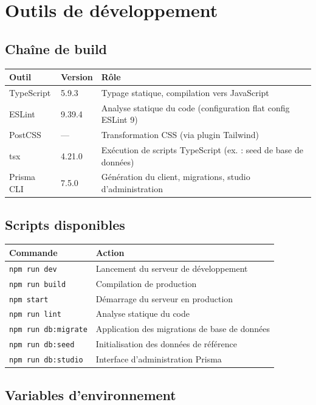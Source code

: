 \documentclass[a4paper,12pt,french]{article}
\begin{document}
\section{Outils de développement}

\subsection{Chaîne de build}

\begin{tabularx}{\textwidth}{l l X}
\toprule
\textbf{Outil} & \textbf{Version} & \textbf{Rôle} \\
\midrule
TypeScript & 5.9.3 & Typage statique, compilation vers JavaScript \\
ESLint & 9.39.4 & Analyse statique du code (configuration flat config ESLint 9) \\
PostCSS & — & Transformation CSS (via plugin Tailwind) \\
tsx & 4.21.0 & Exécution de scripts TypeScript (ex. : seed de base de données) \\
Prisma CLI & 7.5.0 & Génération du client, migrations, studio d'administration \\
\bottomrule
\end{tabularx}

\subsection{Scripts disponibles}

\begin{tabularx}{\textwidth}{l X}
\toprule
\textbf{Commande} & \textbf{Action} \\
\midrule
\texttt{npm run dev} & Lancement du serveur de développement \\
\texttt{npm run build} & Compilation de production \\
\texttt{npm start} & Démarrage du serveur en production \\
\texttt{npm run lint} & Analyse statique du code \\
\texttt{npm run db:migrate} & Application des migrations de base de données \\
\texttt{npm run db:seed} & Initialisation des données de référence \\
\texttt{npm run db:studio} & Interface d'administration Prisma \\
\bottomrule
\end{tabularx}

\subsection{Variables d'environnement}
\end{document}
